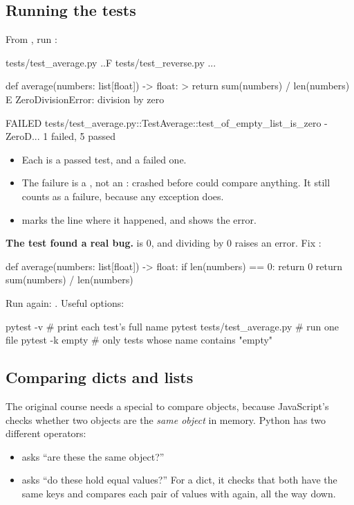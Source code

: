 \subsection{Running the tests}

From , run :

\begin{code}
tests/test_average.py ..F
tests/test_reverse.py ...

    def average(numbers: list[float]) -> float:
>   	return sum(numbers) / len(numbers)
E    ZeroDivisionError: division by zero

FAILED tests/test_average.py::TestAverage::test_of_empty_list_is_zero - ZeroD...
1 failed, 5 passed
\end{code}

\begin{itemize}
\item Each  is a passed test, and  a failed one.
\item The failure is a , not an :  crashed before  could compare anything. It still counts as a failure, because any exception does.
\item \cd{>} marks the line where it happened, and  shows the error.
\end{itemize}

\textbf{The test found a real bug.}  is 0, and dividing by 0 raises an error. Fix :

\begin{py}
def average(numbers: list[float]) -> float:
	if len(numbers) == 0:
		return 0
	return sum(numbers) / len(numbers)
\end{py}

Run  again: . Useful options:

\begin{code}
pytest -v                        # print each test's full name
pytest tests/test_average.py     # run one file
pytest -k empty                  # only tests whose name contains "empty"
\end{code}

\subsection{Comparing dicts and lists}

The original course needs a special  to compare objects, because JavaScript's \cd{===} checks whether two objects are the \emph{same object} in memory. Python has two different operators:
\begin{itemize}
\item {} asks ``are these the same object?''
\item \cd{==} asks ``do these hold equal values?'' For a dict, it checks that both have the same keys and compares each pair of values with \cd{==} again, all the way down.
\end{itemize}

